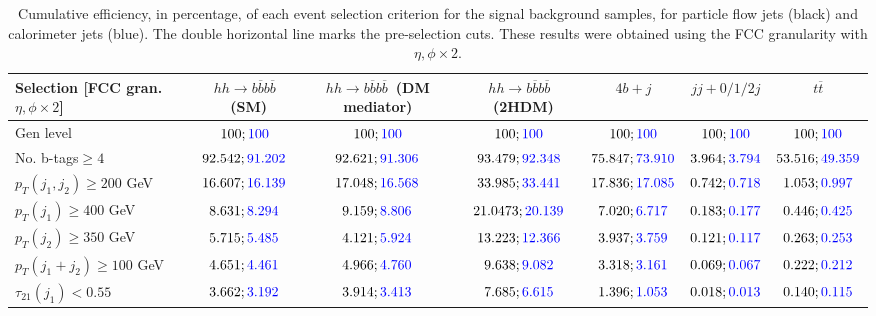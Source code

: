 \begin{landscape}
		\begin{table}
			\centering
			\caption{Cumulative efficiency, in percentage, of each event selection criterion for the signal background samples, for particle flow jets (black) and calorimeter jets (blue). The double horizontal line marks the pre-selection cuts. These results were obtained using the FCC granularity with $\eta,\phi\times 2$.}
			\begin{tabular}{lcccccc}
				\toprule 
				\textbf{Selection [FCC gran. $\eta,\phi\times2$]} & $hh\rightarrow b\overline{b}b\overline{b}$~(SM) & $hh\rightarrow b\overline{b}b\overline{b}$~(DM mediator) & $hh\rightarrow b\overline{b}b\overline{b}$~(2HDM) & $4b+j$  & $jj+0/1/2 j$ & $t\overline{t}$ \\
				\midrule
				Gen level & $100;\textcolor{blue}{100}$ & $100;\textcolor{blue}{100}$ &$100;\textcolor{blue}{100}$& $100;\textcolor{blue}{100}$& $100;\textcolor{blue}{100}$& $100;\textcolor{blue}{100}$ \\
				\rowcolor{black!7}No. b-tags$\geq 4$&$92.542;\textcolor{blue}{91.202}$&$92.621;\textcolor{blue}{91.306}$&$93.479;\textcolor{blue}{92.348}$&$75.847;\textcolor{blue}{73.910}$&$3.964;\textcolor{blue}{3.794}$&$53.516;\textcolor{blue}{49.359}$\\
				$p_T(j_1,j_2)\geq200$ GeV & $16.607;\textcolor{blue}{16.139}$ & $17.048;\textcolor{blue}{16.568}$&$33.985;\textcolor{blue}{33.441}$ &$17.836;\textcolor{blue}{17.085}$&$0.742;\textcolor{blue}{0.718}$&$1.053;\textcolor{blue}{0.997}$\\
				\midrule \midrule
				\rowcolor{black!7}$p_T(j_1)\geq 400$ GeV & $8.631;\textcolor{blue}{8.294}$ &$9.159;\textcolor{blue}{8.806}$  &$21.0473;\textcolor{blue}{20.139}$&$7.020;\textcolor{blue}{6.717}$&$0.183;\textcolor{blue}{0.177}$&$0.446;\textcolor{blue}{0.425}$\\ 
				$p_T(j_2)\geq 350$ GeV & $5.715;\textcolor{blue}{5.485}$& $4.121;\textcolor{blue}{5.924}$&$13.223;\textcolor{blue}{12.366}$&$3.937;\textcolor{blue}{3.759}$&$0.121;\textcolor{blue}{0.117}$&$0.263;\textcolor{blue}{0.253}$\\
				\rowcolor{black!7}$p_T(j_1+j_2)\geq 100$ GeV &$4.651;\textcolor{blue}{4.461}$ & $4.966;\textcolor{blue}{4.760}$ &$9.638;\textcolor{blue}{9.082}$&$3.318;\textcolor{blue}{3.161}$&$0.069;\textcolor{blue}{0.067}$&$0.222;\textcolor{blue}{0.212}$\\
				$\tau_{21}(j_1)<0.55$ & $3.662;\textcolor{blue}{3.192}$& $3.914;\textcolor{blue}{3.413}$&$7.685;\textcolor{blue}{6.615}$&$1.396;\textcolor{blue}{1.053}$&$0.018;\textcolor{blue}{0.013}$&$0.140;\textcolor{blue}{0.115}$\\

\end{tabular}
\end{table}
\end{landscape}
